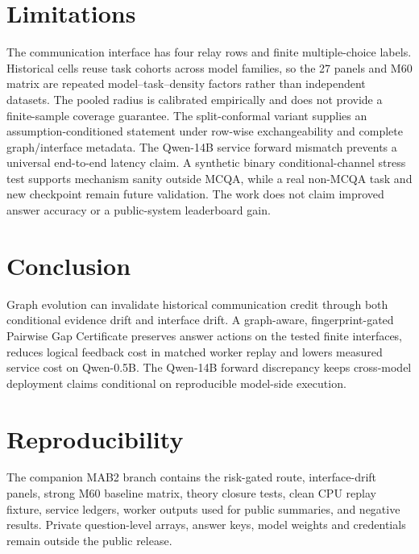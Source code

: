\documentclass[11pt]{article}
\begin{document}
\section{Limitations}
The communication interface has four relay rows and finite multiple-choice labels. Historical cells reuse task cohorts across model families, so the 27 panels and M60 matrix are repeated model--task--density factors rather than independent datasets. The pooled radius is calibrated empirically and does not provide a finite-sample coverage guarantee. The split-conformal variant supplies an assumption-conditioned statement under row-wise exchangeability and complete graph/interface metadata. The Qwen-14B service forward mismatch prevents a universal end-to-end latency claim. A synthetic binary conditional-channel stress test supports mechanism sanity outside MCQA, while a real non-MCQA task and new checkpoint remain future validation. The work does not claim improved answer accuracy or a public-system leaderboard gain.

\section{Conclusion}
Graph evolution can invalidate historical communication credit through both conditional evidence drift and interface drift. A graph-aware, fingerprint-gated Pairwise Gap Certificate preserves answer actions on the tested finite interfaces, reduces logical feedback cost in matched worker replay and lowers measured service cost on Qwen-0.5B. The Qwen-14B forward discrepancy keeps cross-model deployment claims conditional on reproducible model-side execution.

\section*{Reproducibility}
The companion MAB2 branch contains the risk-gated route, interface-drift panels, strong M60 baseline matrix, theory closure tests, clean CPU replay fixture, service ledgers, worker outputs used for public summaries, and negative results. Private question-level arrays, answer keys, model weights and credentials remain outside the public release.
\end{document}
